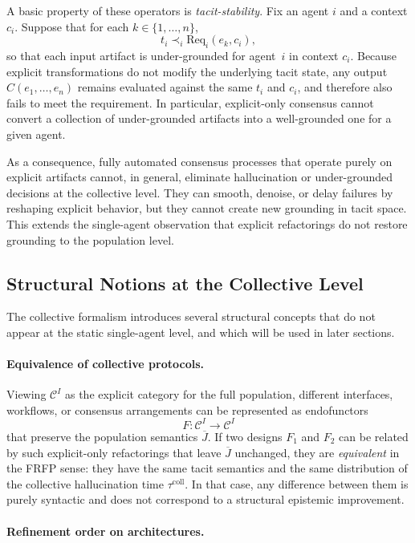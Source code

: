 \documentclass[11pt]{article}
\theoremstyle{definition}
\begin{document}
A basic property of these operators is \emph{tacit-stability}. Fix an agent
$i$ and a context $c_i$. Suppose that for each $k \in \{1,\dots,n\}$,
\[
  t_i \prec_i \mathrm{Req}_i(e_k,c_i),
\]
so that each input artifact is under-grounded for agent~$i$ in context
$c_i$. Because explicit transformations do not modify the underlying tacit
state, any output $C(e_1,\dots,e_n)$ remains evaluated against the same
$t_i$ and $c_i$, and therefore also fails to meet the requirement. In
particular, explicit-only consensus cannot convert a collection of
under-grounded artifacts into a well-grounded one for a given agent.

As a consequence, fully automated consensus processes that operate purely
on explicit artifacts cannot, in general, eliminate hallucination or
under-grounded decisions at the collective level. They can smooth,
denoise, or delay failures by reshaping explicit behavior, but they cannot
create new grounding in tacit space. This extends the single-agent
observation that explicit refactorings do not restore grounding to the
population level.

\subsection{Structural Notions at the Collective Level}

The collective formalism introduces several structural concepts that do not
appear at the static single-agent level, and which will be used in later
sections.

\paragraph{Equivalence of collective protocols.}

Viewing $\mathcal{C}^I$ as the explicit category for the full population,
different interfaces, workflows, or consensus arrangements can be
represented as endofunctors
\[
  F : \mathcal{C}^I \longrightarrow \mathcal{C}^I
\]
that preserve the population semantics $\overline{J}$. If two designs
$F_1$ and $F_2$ can be related by such explicit-only refactorings that
leave $\overline{J}$ unchanged, they are \emph{equivalent} in the FRFP
sense: they have the same tacit semantics and the same distribution of the
collective hallucination time $\tau^{\mathrm{coll}}$. In that case, any
difference between them is purely syntactic and does not correspond to a
structural epistemic improvement.

\paragraph{Refinement order on architectures.}
\end{document}
